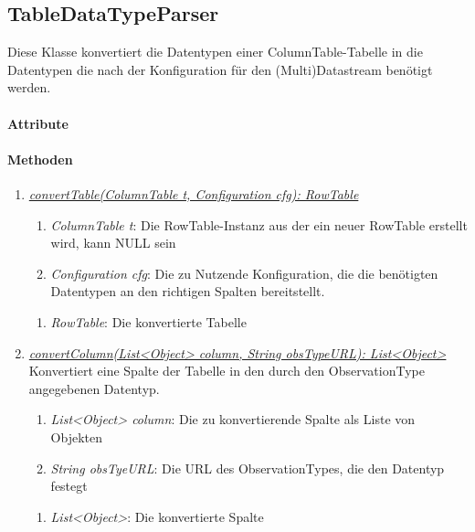\subsection{TableDataTypeParser}

Diese Klasse konvertiert die Datentypen einer ColumnTable-Tabelle in die Datentypen die nach der Konfiguration für den (Multi)Datastream benötigt werden.

\paragraph{Attribute}

\paragraph{Methoden}

\begin{enumerate}[+]
	\item \underline{\textit{convertTable(ColumnTable t, Configuration cfg): RowTable}} \\	
	\begin{enumerate}[$\bullet$]
		\item \textit{ColumnTable t}: Die RowTable-Instanz aus der ein neuer RowTable erstellt wird, kann NULL sein
		\item \textit{Configuration cfg}: Die zu Nutzende Konfiguration, die die benötigten Datentypen an den richtigen Spalten bereitstellt.
	\end{enumerate}
	\vspace{-0.2cm}
	\begin{enumerate}[$\circ$]
		\item \textit{RowTable}: Die konvertierte Tabelle
	\end{enumerate}

	\item \underline{\textit{convertColumn(List<Object> column, String obsTypeURL): List<Object>}} \\
	Konvertiert eine Spalte der Tabelle in den durch den ObservationType angegebenen Datentyp.
	\begin{enumerate}[$\bullet$]
		\item \textit{List<Object> column}: Die zu konvertierende Spalte als Liste von Objekten
		\item \textit{String obsTyeURL}: Die URL des ObservationTypes, die den Datentyp festegt
	\end{enumerate}
	\vspace{-0.2cm}
	\begin{enumerate}[$\circ$]
		\item \textit{List<Object>}: Die konvertierte Spalte
	\end{enumerate}
\end{enumerate}

